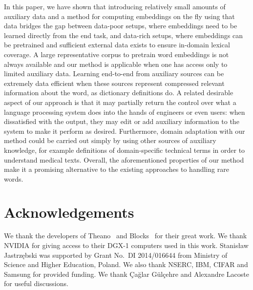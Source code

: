 In this paper, we have shown that introducing relatively small amounts of auxiliary data and a method for computing embeddings on the fly using that data bridges the gap between data-poor setups, where embeddings need to be learned directly from the end task, and data-rich setups, where embeddings can be pretrained and sufficient external data exists to ensure in-domain lexical coverage.  
A large representative corpus to pretrain word embeddings is not always available and our method is applicable when one has access only to limited auxiliary data. 
Learning end-to-end from auxiliary sources can be extremely data efficient when these sources represent compressed relevant information about the word, as dictionary definitions do. 
A related desirable aspect of our approach is that it may partially return the control over what a language processing system does into the hands of engineers or even users: when dissatisfied with the output, they may edit or add auxiliary information to the system to make it perform as desired. 
Furthermore, domain adaptation with our method could be carried out simply by using other sources of auxiliary knowledge, for example definitions of domain-specific technical terms in order to understand medical texts. Overall, the aforementioned properties of our method make it a promising alternative to the existing approaches to handling rare words.


\small

\section*{Acknowledgements}
We thank the developers of Theano~\citep{team2016theano} and Blocks~\citep{blocksfuel} for their great work. 
We thank NVIDIA for giving access to their DGX-1 computers used in this work. Stanisław Jastrzębski  was supported by Grant No.~DI 2014/016644 from Ministry of Science and Higher Education, Poland. We also thank NSERC, IBM, CIFAR and Samsung for provided funding. We thank Çağlar Gülçehre
and Alexandre Lacoste for useful discussions. 






